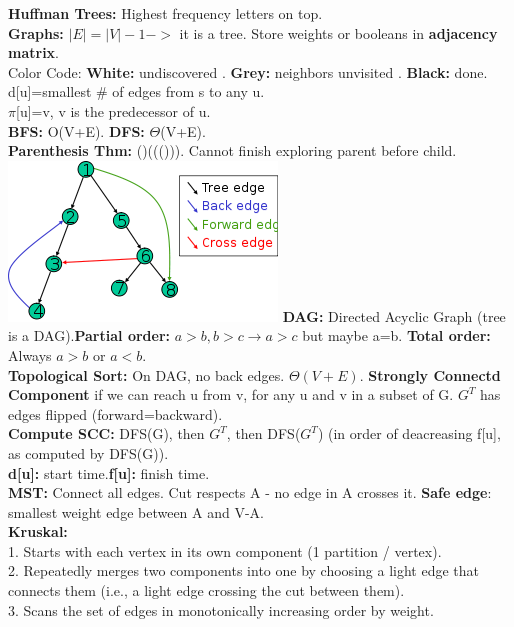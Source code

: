 \documentclass[paper=a4, fontsize=11pt]{scrartcl} %
\begin{document}
\textbf{Huffman Trees: } Highest frequency letters on top.\\
\textbf{Graphs: }$|E|=|V|-1 ->$ it is a tree. Store weights or booleans in \textbf{adjacency matrix}.\\
Color Code: \textbf{White:} undiscovered . \textbf{Grey:} neighbors unvisited . \textbf{Black:} done.\\
d[u]=smallest \# of edges from s to any u.\\
$\pi$[u]=v, v is the predecessor of u.\\
\textbf{BFS:} O(V+E). \textbf{DFS:} $\Theta$(V+E).\\
\textbf{Parenthesis Thm:} ()((())). Cannot finish exploring parent before child.\\
\includegraphics{edges.png}
\textbf{DAG:} Directed Acyclic Graph (tree is a DAG).\textbf{Partial order:} $a>b,b>c \rightarrow a>c$ but maybe a=b. \textbf{Total order:} Always $a>b$ or $a<b$.\\
\textbf{Topological Sort:} On DAG, no back edges. $\Theta(V+E)$. \textbf{Strongly Connectd Component } if we can reach u from v, for any u and v in a subset of G. $G^T$ has edges flipped (forward=backward).\\
\textbf{Compute SCC:} DFS(G), then $G^T$, then DFS($G^T$) (in order of deacreasing f[u], as computed by DFS(G)).\\
\textbf{d[u]:} start time.\textbf{f[u]:} finish time.\\
\textbf{MST: }Connect all edges. Cut respects A - no edge in A crosses it.\textbf{ Safe edge}: smallest weight edge between A and V-A.\\
\textbf{Kruskal:}\\
1. Starts	with	each	vertex	in	its	own	component (1 partition / vertex).	\\
2. Repeatedly	merges	two	components	into	one	by	choosing	a	
light	edge	that	connects	them	(i.e.,	a	light	edge	crossing	the	
cut	between	them).	\\
3. Scans	the	set	of	edges	in	monotonically	increasing	order	by	
weight.	\\
\end{document}
